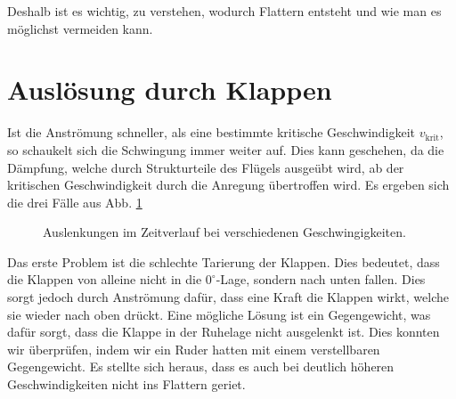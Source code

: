 \documentclass[12pt,a4paper,titlepage,headinclude,bibtotoc]{scrartcl}
\begin{document}
Deshalb ist es wichtig, zu verstehen, wodurch Flattern entsteht und wie man es möglichst vermeiden kann.


\section{Auslösung durch Klappen}
Ist die Anströmung schneller, als eine bestimmte kritische Geschwindigkeit $v_\text{krit}$, so schaukelt sich die Schwingung immer weiter auf.
Dies kann geschehen, da die Dämpfung, welche durch Strukturteile des Flügels ausgeübt wird, ab der kritischen Geschwindigkeit durch die Anregung übertroffen wird.
Es ergeben sich die drei Fälle aus Abb. \ref{fig:daempfung}

\begin{figure}[h]
  \centering
  \hfill
  \hfill
  \caption{Auslenkungen im Zeitverlauf bei verschiedenen Geschwingigkeiten.}
  \label{fig:daempfung}
\end{figure}

Das erste Problem ist die schlechte Tarierung der Klappen.
Dies bedeutet, dass die Klappen von alleine nicht in die $0^\circ$-Lage, sondern nach unten fallen.
Dies sorgt jedoch durch Anströmung dafür, dass eine Kraft die Klappen wirkt, welche sie wieder nach oben drückt.
Eine mögliche Lösung ist ein Gegengewicht, was dafür sorgt, dass die Klappe in der Ruhelage nicht ausgelenkt ist.
Dies konnten wir überprüfen, indem wir ein Ruder hatten mit einem verstellbaren Gegengewicht.
Es stellte sich heraus, dass es auch bei deutlich höheren Geschwindigkeiten nicht ins Flattern geriet.
\end{document}
